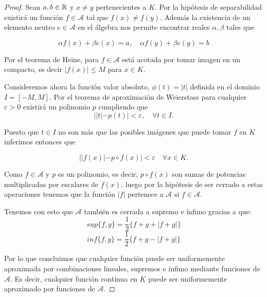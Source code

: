 \begin{proof}
    Sean $a, b \in \mathbb{R}$ y $x \neq y$ pertenecientes a $K$.  Por la hipótesis de separabilidad existirá un función $f \in \mathcal{A}$ tal que $f(x) \neq f(y)$.  Además la existencia de un elemento neutro 
    $e \in \mathcal{A}$ en el álgebra nos permite encontrar reales $\alpha, \beta$ tales que 

    $$\alpha f(x) + \beta e(x) = a, \quad \alpha f(y) + \beta e(y) = b$$  

     Por el teorema de Heine, para $f \in \mathcal A$ está acotada por tomar imagen en un compacto, es decir $|f(x)| \leq M$ para $x \in K.$  

    Consideremos ahora la función valor absoluto, $\phi(t)=|t|$ definida en el dominio $I = [-M, M].$
    Por el teorema de aproximación de Weierstass  
    para cualquier $\varepsilon > 0$ 
    existirá un polinomio $p$ cumpliendo que 
    $$||t|- p(t)| < \varepsilon, \quad \forall t \in I.$$

    Puesto que $t \in I$ no son más que las posibles imágenes que puede tomar $f$ en $K$ inferimos entonces que 

    $$||f(x)| - p \circ f(x)| < \varepsilon \quad \forall x \in K.$$

    Como $f \in \mathcal{A}$ y $p$ es un polinomio, es decir,  $p \circ f(x)$ son sumas de potencias multiplicadas por escalares de $f(x)$, luego por la hipótesis de ser cerrado a estas operaciones tenemos que la función 
    $|f|$ pertenece a $\mathcal{A}$ si $f \in \mathcal{A}.$  


    Tenemos con esto que $\mathcal{A}$ también es cerrada a supremo e ínfimo  gracias a que:   
    $$sup\{f,g\} = \frac{1}{2} \{f+g+ |f+g|\}$$
    $$inf\{f,g\} = \frac{1}{2} \{f+g -|f+g|\}$$
    
    Por lo que concluimos que cualquier función puede ser uniformemente aproximada por combinaciones lineales, supremos e ínfimo mediante funciones de $\mathcal{A}$.   Es decir, cualquier función continua en $K$
    puede ser uniformemente aproximado por funciones de $\mathcal{A}$. 


    



\end{proof}

\endinput